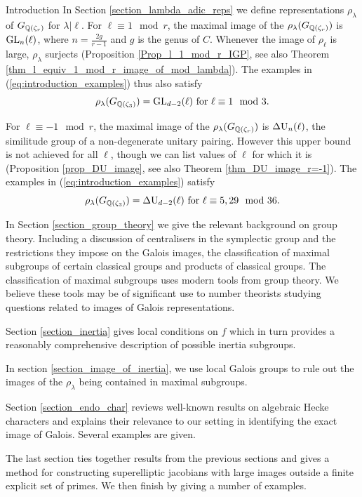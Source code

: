 \documentclass[11pt,a4paper]{article}
\newcommand{\Gcyclo}[1]{G_{\QQ(\zeta_{#1})}}
\newcommand{\GQr}{G_{\QQ(\zeta_{r})}}
\begin{document}
\begin{section}{Introduction}
In Section \ref{section_lambda_adic_reps} we define representations $\rho_\lambda$ of $\GQr$ for $\lambda| \ell$.
For $\ell \equiv 1 \mod{r}$, the maximal image of the $\rho_\lambda(\GQr)$ is $\GL_n(\ell)$, where $n = \frac{2g}{r-1}$ and $g$ is the genus of $C$.
Whenever the image of $\rho_\ell$ is large,  $\rho_\lambda$ surjects (Proposition \ref{Prop_l_1_mod_r_IGP}, see also Theorem \ref{thm_l_equiv_1_mod_r_image_of_mod_lambda}).
The examples in (\ref{eq:introduction_examples}) thus also satisfy
\[\rho_\lambda(\Gcyclo{3}) = \GL_{d-2}(\ell)  \text{ for $\ell \equiv 1 \mod{3}$.}\]

For $\ell \equiv -1 \mod{r}$, the maximal image of the $\rho_\lambda(\GQr)$ is $\DU_n(\ell)$, the similitude group of a non-degenerate unitary pairing. However this upper bound is not achieved for all $\ell$, though we can list values of $\ell$ for which it is (Proposition \ref{prop_DU_image}, see also Theorem \ref{thm_DU_image_r=-1}).
The examples in (\ref{eq:introduction_examples}) satisfy
\[\rho_\lambda(\Gcyclo{3})=\DU_{d-2}(\ell) \text{ for $\ell \equiv 5,29 \mod{36}$.}\]

In Section \ref{section_group_theory} we give the relevant background on group theory.
Including a discussion of centralisers in the symplectic group and the restrictions they impose on the Galois images, the classification of maximal subgroups of certain classical groups and products of classical groups.
The classification of maximal subgroups uses modern tools from group theory.
We believe these tools may be of significant use to number theorists studying questions related to images of Galois representations.

Section \ref{section_inertia} gives local conditions on $f$ which in turn provides a reasonably comprehensive description of possible inertia subgroups.

In section \ref{section_image_of_inertia}, we use local Galois groups to rule out the images of the $\rho_\lambda$ being contained in maximal subgroups.

Section \ref{section_endo_char} reviews well-known results on algebraic Hecke characters and explains their relevance to our setting in identifying the exact image of Galois.
Several examples are given.

The last section ties together results from the previous sections and gives a method for constructing superelliptic jacobians with large images outside a finite explicit set of primes.
We then finish by giving a number of examples.




\end{section}
\end{document}
